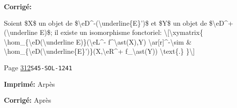 \documentclass[oneside]{book}
\theoremstyle{sga-source}
\theoremstyle{sga-source-dash}
\theoremstyle{sga-source-dotdash}
\theoremstyle{sga-source-number-note-dash}
\theoremstyle{sga-source-note-number-dotdash}
\theoremstyle{sga-source-example-dotdash}
\theoremstyle{sga-source-inline-number}
\theoremstyle{sga-source-bare-number}
\theoremstyle{sga-source}
\begin{document}
\begin{description}
\par\noindent\textbf{Corrigé:} {\footnotesize\ttfamily\raggedright Soient \$X\$ un objet de \$\textbackslash{}\allowbreak{}eD\textasciicircum{}\allowbreak{}-\allowbreak{}(\allowbreak{}\textbackslash{}\allowbreak{}underline\{\allowbreak{}E\}\allowbreak{}')\allowbreak{}\$ et \$Y\$ un objet de  \$\textbackslash{}\allowbreak{}eD\textasciicircum{}\allowbreak{}+\allowbreak{}(\allowbreak{}\textbackslash{}\allowbreak{}underline E)\allowbreak{}\$; il existe un isomorphisme fonctoriel:  \textbackslash{}\allowbreak{}[\allowbreak{}\textbackslash{}\allowbreak{}xymatrix\{\allowbreak{}   \textbackslash{}\allowbreak{}hom\_\allowbreak{}\{\allowbreak{}\textbackslash{}\allowbreak{}eD(\allowbreak{}\textbackslash{}\allowbreak{}underline E)\allowbreak{}\}\allowbreak{}(\allowbreak{}\textbackslash{}\allowbreak{}eL\textasciicircum{}\allowbreak{}-\allowbreak{} f\textasciicircum{}\allowbreak{}\textbackslash{}\allowbreak{}ast(\allowbreak{}X)\allowbreak{},\allowbreak{}Y)\allowbreak{} \textbackslash{}\allowbreak{}ar[\allowbreak{}r]\allowbreak{}\textasciicircum{}\allowbreak{}-\allowbreak{}\textbackslash{}\allowbreak{}sim      \& \textbackslash{}\allowbreak{}hom\_\allowbreak{}\{\allowbreak{}\textbackslash{}\allowbreak{}eD(\allowbreak{}\textbackslash{}\allowbreak{}underline\{\allowbreak{}E\}\allowbreak{}')\allowbreak{}\}\allowbreak{}(\allowbreak{}X,\allowbreak{}\textbackslash{}\allowbreak{}eR\textasciicircum{}\allowbreak{}+\allowbreak{} f\_\allowbreak{}\textbackslash{}\allowbreak{}ast(\allowbreak{}Y)\allowbreak{})\allowbreak{} \textbackslash{}\allowbreak{}text\{\allowbreak{}.\}\allowbreak{} \}\allowbreak{}\textbackslash{}\allowbreak{}]\allowbreak{}\par}
\smallskip
\item[\hypertarget{apparatus:FR-0312}{312}] Page \hyperlink{printpage:fr:312}{312}\quad\texttt{S45-SOL-1241}
\par\noindent\textbf{Imprimé:} Arpès
\par\noindent\textbf{Corrigé:} Après
\smallskip
\end{description}
\endgroup
\fi
\end{document}

